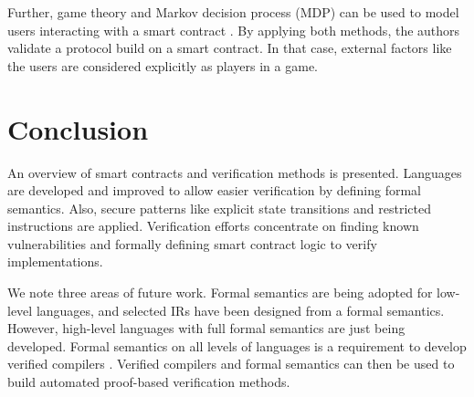 \documentclass{llncs}
\begin{document}
Further, game theory and Markov decision process (MDP) can be used to model users interacting with a smart contract \cite{Bigi2015}. By applying both methods, the authors validate a protocol build on a smart contract. In that case, external factors like the users are considered explicitly as players in a game.




\section{Conclusion}
\label{conclusion}
An overview of smart contracts and verification methods is presented.
Languages are developed and improved to allow easier verification by defining formal semantics. Also, secure patterns like explicit state transitions and restricted instructions are applied. Verification efforts concentrate on finding known vulnerabilities and formally defining smart contract logic to verify implementations.

We note three areas of future work. Formal semantics are being adopted for low-level languages, and selected IRs have been designed from a formal semantics. However, high-level languages with full formal semantics are just being developed.
Formal semantics on all levels of languages is a requirement to develop verified compilers \cite{Hirai2017}. Verified compilers and formal semantics can then be used to build automated proof-based verification methods.


\printbibliography
\end{document}
